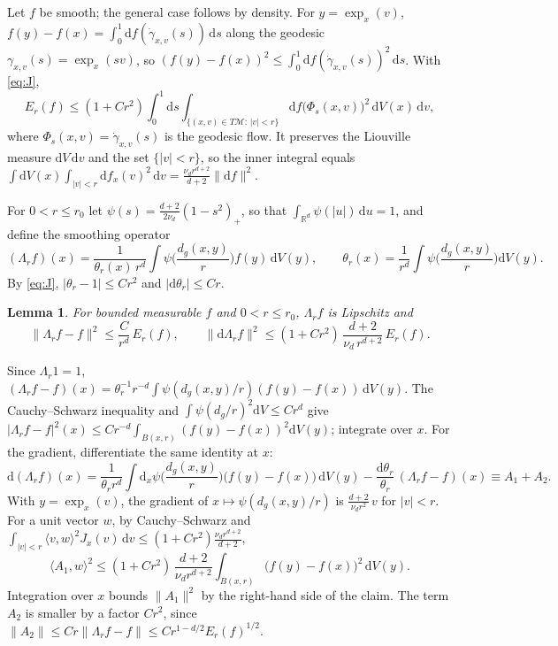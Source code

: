 \documentclass[11pt,a4paper]{article}
\makeatletter
\theoremstyle{stmt}
\newtheorem{lemma}[theorem]{Lemma}
\theoremstyle{defn}
\theoremstyle{rmk}
\renewenvironment{proof}[1][\proofname]{\par\pushQED{\qed}\normalfont\topsep6\p@\@plus6\p@\relax
  \trivlist\item[\hskip\labelsep{\sffamily\itshape\small #1.}]\ignorespaces}{\popQED\endtrivlist\@endpefalse}
\numberwithin{equation}{section}
\newcommand{\M}{\mathcal{M}}
\newcommand{\R}{\mathbb{R}}
\newcommand{\dd}{\mathrm{d}}
\makeatother
\begin{document}
\begin{proof}
Let $f$ be smooth; the general case follows by density. For $y=\exp_x(v)$, $f(y)-f(x)=\int_0^1\dd f(\dot\gamma_{x,v}(s))\,\dd s$ along the geodesic $\gamma_{x,v}(s)=\exp_x(sv)$, so $(f(y)-f(x))^2\le\int_0^1\dd f(\dot\gamma_{x,v}(s))^2\,\dd s$. With \eqref{eq:J},
\[
E_r(f)\le(1+Cr^2)\int_0^1\dd s\int_{\{(x,v)\in T\M:\,|v|<r\}}\dd f\big(\Phi_s(x,v)\big)^2\,\dd V(x)\,\dd v ,
\]
where $\Phi_s(x,v)=\dot\gamma_{x,v}(s)$ is the geodesic flow. It preserves the Liouville measure $\dd V\,\dd v$ and the set $\{|v|<r\}$, so the inner integral equals $\int\dd V(x)\int_{|v|<r}\dd f_x(v)^2\,\dd v=\tfrac{\nu_dr^{d+2}}{d+2}\|\dd f\|^2$.
\end{proof}

For $0<r\le r_0$ let $\psi(s)=\tfrac{d+2}{2\nu_d}(1-s^2)_+$, so that $\int_{\R^d}\psi(|u|)\,\dd u=1$, and define the smoothing operator
\begin{equation}
(\Lambda_rf)(x)=\frac{1}{\theta_r(x)\,r^d}\int\psi\Big(\frac{d_g(x,y)}{r}\Big)f(y)\,\dd V(y),\qquad \theta_r(x)=\frac1{r^d}\int\psi\Big(\frac{d_g(x,y)}{r}\Big)\dd V(y).
\end{equation}
By \eqref{eq:J}, $|\theta_r-1|\le Cr^2$ and $|\dd\theta_r|\le Cr$.

\begin{lemma}\label{lem:smooth}
For bounded measurable $f$ and $0<r\le r_0$, $\Lambda_rf$ is Lipschitz and
\begin{equation}
\|\Lambda_rf-f\|^2\le\frac{C}{r^d}\,E_r(f),\qquad \|\dd\Lambda_rf\|^2\le(1+Cr^2)\,\frac{d+2}{\nu_d\,r^{d+2}}\,E_r(f).
\end{equation}
\end{lemma}

\begin{proof}
Since $\Lambda_r1=1$, $(\Lambda_rf-f)(x)=\theta_r^{-1}r^{-d}\int\psi(d_g(x,y)/r)(f(y)-f(x))\,\dd V(y)$. The Cauchy--Schwarz inequality and $\int\psi(d_g/r)^2\dd V\le Cr^d$ give $|\Lambda_rf-f|^2(x)\le Cr^{-d}\int_{B(x,r)}(f(y)-f(x))^2\dd V(y)$; integrate over $x$. For the gradient, differentiate the same identity at $x$:
\[
\dd(\Lambda_rf)(x)=\frac{1}{\theta_rr^d}\int\dd_x\psi\Big(\frac{d_g(x,y)}{r}\Big)\big(f(y)-f(x)\big)\,\dd V(y)-\frac{\dd\theta_r}{\theta_r}\,(\Lambda_rf-f)(x)\equiv A_1+A_2 .
\]
With $y=\exp_x(v)$, the gradient of $x\mapsto\psi(d_g(x,y)/r)$ is $\tfrac{d+2}{\nu_dr^2}\,v$ for $|v|<r$. For a unit vector $w$, by Cauchy--Schwarz and $\int_{|v|<r}\langle v,w\rangle^2J_x(v)\,\dd v\le(1+Cr^2)\tfrac{\nu_dr^{d+2}}{d+2}$,
\[
\langle A_1,w\rangle^2\le(1+Cr^2)\,\frac{d+2}{\nu_dr^{d+2}}\int_{B(x,r)}\big(f(y)-f(x)\big)^2\,\dd V(y).
\]
Integration over $x$ bounds $\|A_1\|^2$ by the right-hand side of the claim. The term $A_2$ is smaller by a factor $Cr^2$, since $\|A_2\|\le Cr\|\Lambda_rf-f\|\le Cr^{1-d/2}E_r(f)^{1/2}$.
\end{proof}
\end{document}
